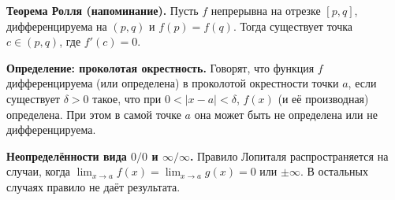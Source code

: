 
\textbf{Теорема Ролля (напоминание).}
Пусть $f$ непрерывна на отрезке $[p,q]$, дифференцируема на $(p,q)$ и $f(p)=f(q)$. Тогда существует точка $c\in(p,q)$, где $f'(c)=0$.

\medskip

\textbf{Определение: проколотая окрестность.}
Говорят, что функция $f$ дифференцируема (или определена) в проколотой окрестности точки $a$, если существует $\delta>0$ такое, что при $0<|x-a|<\delta$, $f(x)$ (и её производная) определена. При этом в самой точке $a$ она может быть не определена или не дифференцируема.

\medskip

\textbf{Неопределённости вида $0/0$ и $\infty/\infty$.}
Правило Лопиталя распространяется на случаи, когда \(\lim_{x\to a}f(x)=\lim_{x\to a}g(x)=0\) или \(\pm\infty\). В остальных случаях правило не даёт результата.

